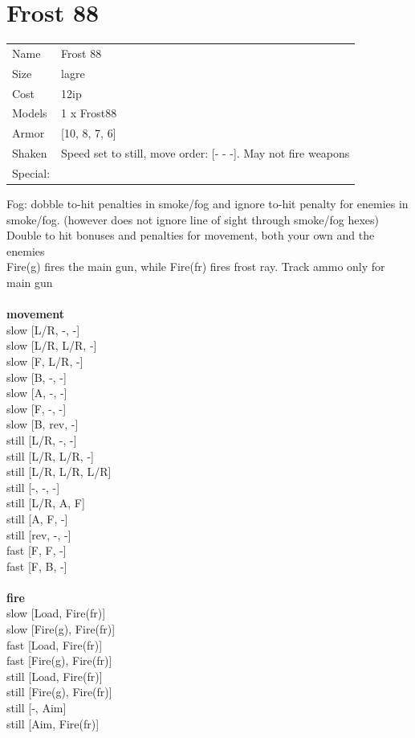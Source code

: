 \clearpage

\section{ Frost 88 }

\begin{tabular}{ll}
  Name & Frost 88 \\
  Size & lagre\\
  Cost & 12ip\\
  Models & 1 x Frost88\\
  Armor & [10, 8, 7, 6]\\
  Shaken & Speed set to still, move order: [- - -]. May not fire weapons\\
  Special: \\
\end{tabular}

\noindent Fog: dobble to-hit penalties in smoke/fog and ignore to-hit penalty for enemies in smoke/fog. (however does not ignore line of sight through smoke/fog hexes)\\ 
Double to hit bonuses and penalties for movement, both your own and the enemies\\ 
Fire(g) fires the main gun, while Fire(fr) fires frost ray. Track ammo only for main gun\\ 


\ \\ {\bf movement } \\
slow [L/R, -, -] \\
slow [L/R, L/R, -] \\
slow [F, L/R, -] \\
slow [B, -, -] \\
slow [A, -, -] \\
slow [F, -, -] \\
slow [B, rev, -] \\
still [L/R, -, -] \\
still [L/R, L/R, -] \\
still [L/R, L/R, L/R] \\
still [-, -, -] \\
still [L/R, A, F] \\
still [A, F, -] \\
still [rev, -, -] \\
fast [F, F, -] \\
fast [F, B, -] \\
\ \\ {\bf fire } \\
slow [Load, Fire(fr)] \\
slow [Fire(g), Fire(fr)] \\
fast [Load, Fire(fr)] \\
fast [Fire(g), Fire(fr)] \\
still [Load, Fire(fr)] \\
still [Fire(g), Fire(fr)] \\
still [-, Aim] \\
still [Aim, Fire(fr)] \\


